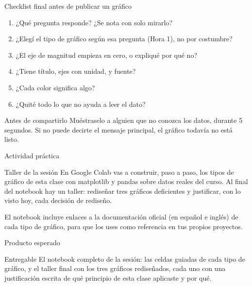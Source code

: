 \documentclass[aspectratio=169,11pt]{beamer}
\begin{document}
\begin{frame}{Checklist final antes de publicar un gráfico}
  \small
  \begin{enumerate}
    \small
    \item ¿Qué pregunta responde? ¿Se nota con solo mirarlo?
    \item ¿Elegí el tipo de gráfico según esa pregunta (Hora 1), no por
      costumbre?
    \item ¿El eje de magnitud empieza en cero, o expliqué por qué no?
    \item ¿Tiene título, ejes con unidad, y fuente?
    \item ¿Cada color significa algo?
    \item ¿Quité todo lo que no ayuda a leer el dato?
  \end{enumerate}
  \vspace{0.2cm}
  \begin{alertblock}{Antes de compartirlo}
    \small Muéstraselo a alguien que no conozca los datos, durante 5
    segundos. Si no puede decirte el mensaje principal, el gráfico todavía
    no está listo.
  \end{alertblock}
\end{frame}

\begin{frame}{Actividad práctica}
  \begin{alertblock}{Taller de la sesión}
    \small En Google Colab vas a construir, paso a paso, los tipos de
    gráfico de esta clase con matplotlib y pandas sobre datos reales del
    curso. Al final del notebook hay un taller: rediseñar tres gráficos
    deficientes y justificar, con lo visto hoy, cada decisión de rediseño.
  \end{alertblock}
  \small El notebook incluye enlaces a la documentación oficial (en
  español e inglés) de cada tipo de gráfico, para que los uses como
  referencia en tus propios proyectos.
\end{frame}

\begin{frame}{Producto esperado}
  \begin{exampleblock}{Entregable}
    \small El notebook completo de la sesión: las celdas guiadas de cada
    tipo de gráfico, y el taller final con los tres gráficos rediseñados,
    cada uno con una justificación escrita de qué principio de esta clase
    aplicaste y por qué.
  \end{exampleblock}
\end{frame}
\end{document}
